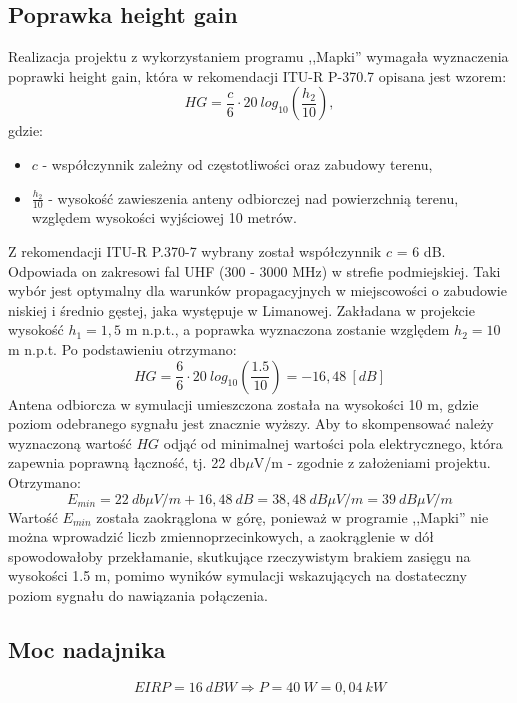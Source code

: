 \documentclass[12pt, a4paper, oneside]{article}
\begin{document}
\subsection{Poprawka height gain}
\indent\indent Realizacja projektu z wykorzystaniem programu ,,Mapki'' wymagała wyznaczenia poprawki height gain, która w rekomendacji ITU-R P-370.7 opisana jest wzorem:
\begin{equation}
HG = \frac{c}{6}\cdot20~ log_{10}(\frac{h_2}{10}),
\end{equation}
gdzie:
\begin{itemize}
\item $c$ - współczynnik zależny od częstotliwości oraz zabudowy terenu,
\item $\frac{h_2}{10}$ - wysokość zawieszenia anteny odbiorczej nad powierzchnią terenu, względem wysokości wyjściowej 10 metrów.
\end{itemize}
\indent\indent Z rekomendacji ITU-R P.370-7 wybrany został współczynnik $c$ = 6 dB. Odpowiada on zakresowi fal UHF (300 - 3000 MHz) w strefie podmiejskiej. Taki wybór jest optymalny dla warunków propagacyjnych w miejscowości o zabudowie niskiej i średnio gęstej, jaka występuje w Limanowej. Zakładana w projekcie wysokość $h_1 = 1,5$ m n.p.t., a poprawka wyznaczona zostanie względem $h_2 = 10$ m n.p.t. Po podstawieniu otrzymano:
\begin{equation}
HG=\frac{6}{6}\cdot 20~log_{10}(\frac{1.5}{10})=-16,48~[dB]
\end{equation}
\indent\indent Antena odbiorcza w symulacji umieszczona została na wysokości 10 m, gdzie poziom odebranego sygnału jest znacznie wyższy. Aby to skompensować należy wyznaczoną wartość $HG$ odjąć od minimalnej wartości pola elektrycznego, która zapewnia poprawną łączność, tj. 22 db$\mu$V/m - zgodnie z założeniami projektu. Otrzymano:
\begin{equation}
E_{min} = 22~db\mu V/m + 16,48~dB = 38,48~dB\mu V/m=39~dB\mu V/m
\end{equation}
Wartość $E_{min}$ została zaokrąglona w górę, ponieważ w programie ,,Mapki'' nie można wprowadzić liczb zmiennoprzecinkowych, a zaokrąglenie w dół spowodowałoby przekłamanie, skutkujące rzeczywistym brakiem zasięgu na wysokości 1.5 m, pomimo wyników symulacji wskazujących na dostateczny poziom sygnału do nawiązania połączenia.
\subsection{Moc nadajnika}
\begin{equation}
EIRP=16~dBW \Rightarrow P = 40~W=0,04~kW
\end{equation}
\end{document}
